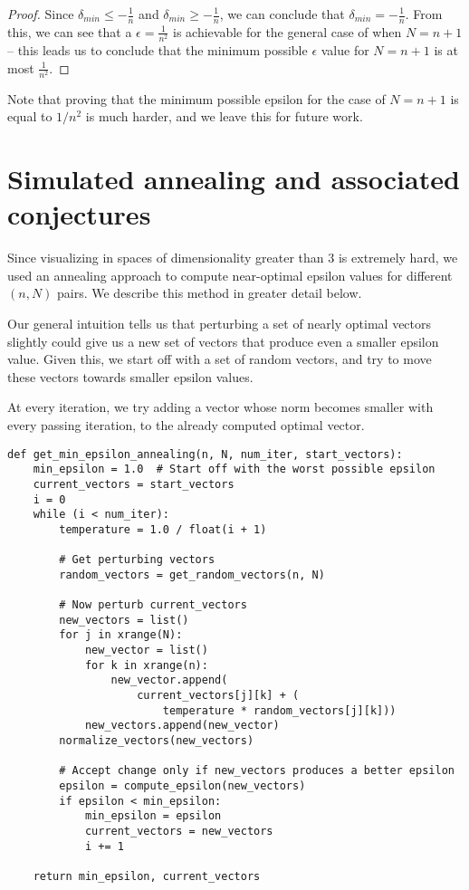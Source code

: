 \documentclass[11pt,letterpaper,twoside,english]{article}
\theoremstyle{theorem}
\theoremstyle{remark}
\begin{document}
\begin{proof}
Since $\delta_{min} \le -\frac{1}{n}$ and $\delta_{min} \ge -\frac{1}{n}$, we can conclude that $\delta_{min}=-\frac{1}{n}$. From this, we can see that a $\epsilon = \frac{1}{n^2}$ is achievable for the general case of when $N=n+1$ -- this leads us to conclude that the minimum possible $\epsilon$ value for $N=n+1$ is at most $\frac{1}{n^2}$.
\end{proof}

Note that proving that the minimum possible epsilon for the case of $N = n+1$ is equal to $1/n^2$ is much harder, and we leave this for future work.

\section{Simulated annealing and associated conjectures}

Since visualizing in spaces of dimensionality greater than $3$ is extremely hard, we used an annealing approach to compute near-optimal epsilon values for different $(n, N)$ pairs. We describe this method in greater detail below.

Our general intuition tells us that perturbing a set of nearly optimal vectors slightly could give us a new set of vectors that produce even a smaller epsilon value. Given this, we start off with a set of random vectors, and try to move these vectors towards smaller epsilon values.

At every iteration, we try adding a vector whose norm becomes smaller with every passing iteration, to the already computed optimal vector.

\begin{lstlisting}
def get_min_epsilon_annealing(n, N, num_iter, start_vectors):
    min_epsilon = 1.0  # Start off with the worst possible epsilon
    current_vectors = start_vectors
    i = 0
    while (i < num_iter):
        temperature = 1.0 / float(i + 1)

        # Get perturbing vectors
        random_vectors = get_random_vectors(n, N)

        # Now perturb current_vectors
        new_vectors = list()
        for j in xrange(N):
            new_vector = list()
            for k in xrange(n):
                new_vector.append(
                    current_vectors[j][k] + (
                    	temperature * random_vectors[j][k]))
            new_vectors.append(new_vector)
        normalize_vectors(new_vectors)
        
        # Accept change only if new_vectors produces a better epsilon
        epsilon = compute_epsilon(new_vectors)
        if epsilon < min_epsilon:
            min_epsilon = epsilon
            current_vectors = new_vectors
            i += 1

    return min_epsilon, current_vectors
\end{lstlisting}
\end{document}
